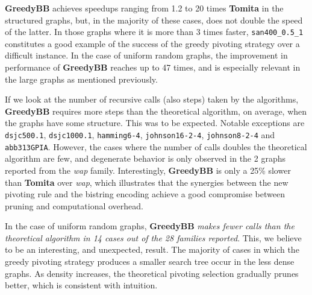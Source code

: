 \documentclass[final,1p]{elsarticle-modified}
\newcommand{\alg}[1]{\textbf{#1}}
\newcommand{\dataset}[1]{\texttt{#1}}
\begin{document}
\alg{GreedyBB} achieves speedups ranging from 1.2 to 20 times \alg{Tomita} in the structured graphs, but, in the majority of these cases, does not double the speed of the latter. In those graphs where it is more than 3 times faster, \dataset{san400\_0.5\_1} constitutes a good example of the success of the greedy pivoting strategy over a difficult instance. In the case of uniform random graphs, the improvement in performance of \alg{GreedyBB} reaches up to 47 times, and is especially relevant in the large graphs as mentioned previously.

If we look at the number of recursive calls (also steps) taken by the algorithms, \alg{GreedyBB} requires more steps than the theoretical algorithm, on average, when the graphs have some structure. This was to be expected. Notable exceptions are \dataset{dsjc500.1}, \dataset{dsjc1000.1}, \dataset{hamming6-4}, \dataset{johnson16-2-4}, \dataset{johnson8-2-4} and \dataset{abb313GPIA}. However, the cases where the number of calls doubles the theoretical algorithm are few, and degenerate behavior is only observed in the 2 graphs reported from the \emph{wap} family. Interestingly, \alg{GreedyBB} is only a 25\% slower than \alg{Tomita} over \emph{wap}, which illustrates that the synergies between the new pivoting rule and the bistring encoding achieve a good compromise between pruning and computational overhead.

In the case of uniform random graphs, \alg{GreedyBB} \emph{makes fewer calls than the theoretical algorithm in 14 cases out of the 28 families reported}. This, we believe to be an interesting, and unexpected, result. The majority of cases in which the greedy pivoting strategy produces a smaller search tree occur in the less dense graphs. As density increases, the theoretical pivoting selection gradually prunes better, which is consistent with intuition.


\end{document}

